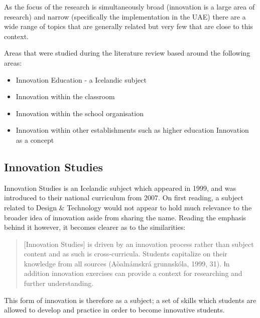 As the focus of the research is simultaneously broad (innovation is a large area of research) and narrow (specifically the implementation in the UAE) there are a wide range of topics that are generally related but very few that are close to this context. 

Areas that were studied during the literature review based around the following areas:
\begin{itemize}
\item Innovation Education - a Icelandic subject
\item Innovation within the classroom
\item Innovation within the school organisation
\item Innovation within other establishments such as higher education
\ite Innovation as a concept
\end{itemize}

\subsection{Innovation Studies}
Innovation Studies is an Icelandic subject which appeared in 1999, and was introduced to their national curriculum from 2007. On first reading, a subject related to Design & Technology would not appear to hold much relevance to the broader idea of innovation aside from sharing the name. Reading the emphasis behind it however, it becomes clearer as to the similarities:
\begin{quote}
[Innovation Studies] is driven by an innovation process rather than subject content and as such is cross-curricula. Students capitalize on their
knowledge from all sources (Aòalnámskrá grunnskóla, 1999, 31). Ⅰn addition innovation exercises can provide a context for researching and further understanding.
\end{quote} \cite{thorsteinsson2005innovation}

This form of innovation is therefore as a subject; a set of skills which students are allowed to develop and practice in order to become innovative students.

\cite{StopI4:online}